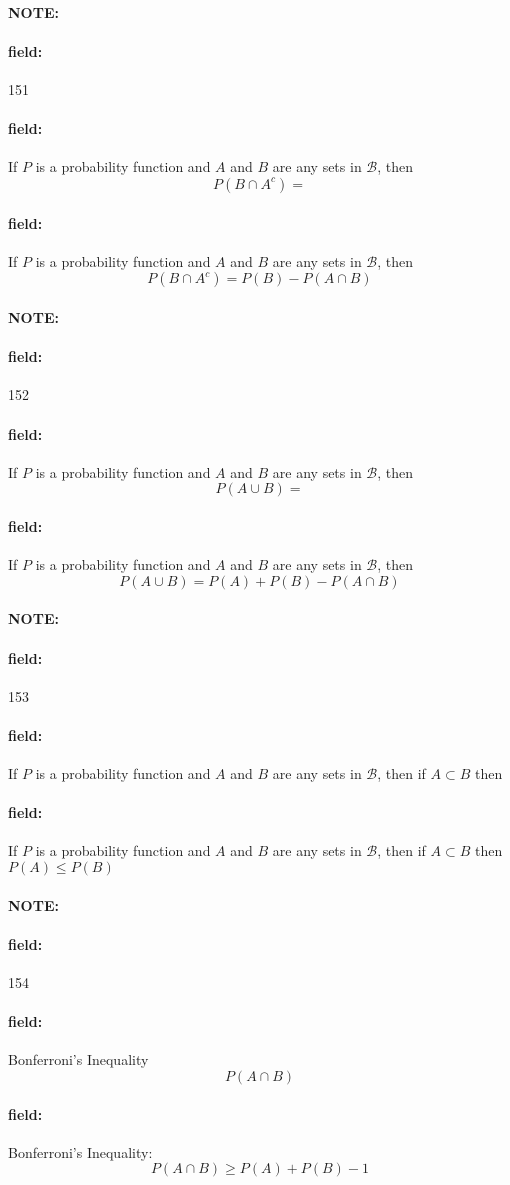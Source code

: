 \documentclass[12pt]{article}
\newenvironment{note}{\paragraph{NOTE:}}{}
\newenvironment{field}{\paragraph{field:}}{}
\begin{document}
\begin{note} \begin{field} \tiny 151 \end{field}
    \begin{field}
        If $P$ is a probability function and $A$ and $B$ are any sets in $\mathcal{B}$, then $$P(B\cap A^c) = $$
    \end{field}
    \begin{field}
        If $P$ is a probability function and $A$ and $B$ are any sets in $\mathcal{B}$, then $$P(B\cap A^c) = P(B) - P(A \cap B)$$
    \end{field}
\end{note}

\begin{note} \begin{field} \tiny 152 \end{field}
    \begin{field}
        If $P$ is a probability function and $A$ and $B$ are any sets in $\mathcal{B}$, then $$P(A\cup B) = $$
    \end{field}
    \begin{field}
        If $P$ is a probability function and $A$ and $B$ are any sets in $\mathcal{B}$, then $$P(A\cup B) = P(A) + P(B) - P(A \cap B)$$
    \end{field}
\end{note}

\begin{note} \begin{field} \tiny 153 \end{field}
    \begin{field}
        If $P$ is a probability function and $A$ and $B$ are any sets in $\mathcal{B}$, then if $A \subset B$ then
    \end{field}
    \begin{field}
        If $P$ is a probability function and $A$ and $B$ are any sets in $\mathcal{B}$, then if $A \subset B$ then $P(A) \leq P(B)$
    \end{field}
\end{note}

\begin{note} \begin{field} \tiny 154 \end{field}
    \begin{field}
        Bonferroni's Inequality
        $$P(A\cap B)  $$
    \end{field}
    \begin{field}
      Bonferroni's Inequality:
        $$P(A\cap B) \geq P(A) + P(B) -1 $$
    \end{field}
\end{note}
\end{document}
